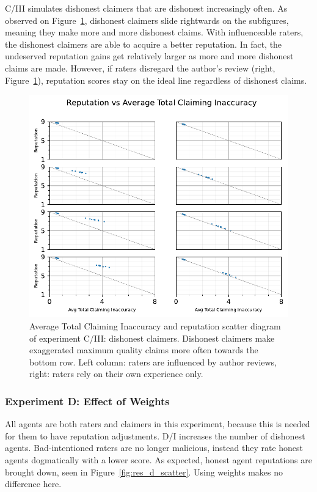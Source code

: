\documentclass[%
    ]{\PathToTumTemplate/thesis/tum_thesis}
\begin{document}
C/III simulates dishonest claimers that are dishonest increasingly often.
As observed on Figure~\ref{fig:res_c3_scatter}, dishonest claimers slide rightwards on the subfigures, meaning they make more and more dishonest claims.
With influenceable raters, the dishonest claimers are able to acquire a better reputation.
In fact, the undeserved reputation gains get relatively larger as more and more dishonest claims are made.
However, if raters disregard the author's review (right, Figure~\ref{fig:res_c3_scatter}), reputation scores stay on the ideal line regardless of dishonest claims.

\begin{figure}[tbp]
  \begin{center}
        \includegraphics[width=0.75\linewidth]	{../results/c3/AvgTotClaimInaccuracyAndReputationScatter_joined.pdf}
    \caption{
    Average Total Claiming Inaccuracy and reputation scatter diagram of experiment C/III: dishonest claimers.
    Dishonest claimers make exaggerated maximum quality claims more often towards the bottom row.
    Left column: raters are influenced by author reviews, right: raters rely on their own experience only.
    }
    \label{fig:res_c3_scatter}
  \end{center}
\end{figure}

\subsubsection{Experiment D: Effect of Weights}

All agents are both raters and claimers in this experiment, because this is needed for them to have reputation adjustments.
D/I increases the number of dishonest agents.
Bad-intentioned raters are no longer malicious, instead they rate honest agents dogmatically with a lower score.
As expected, honest agent reputations are brought down, seen in Figure~\ref{fig:res_d_scatter}.
Using weights makes no difference here.
\end{document}
